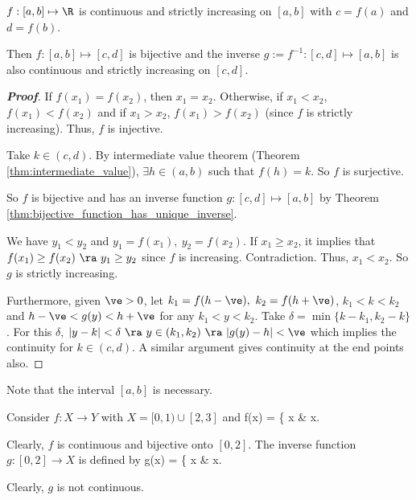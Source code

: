 

\begin{theorem}\label{thm:real_strictly_increasing_continuous_bijective_inverse_strictly_increasing_continuous}%
$f: [a,b]\mapsto \R$ is continuous and strictly increasing on $[a,b]$ with $c=f(a)$ and $d=f(b)$.

Then $f: [a,b]\mapsto [c,d]$ is bijective and the inverse $g:=f^{-1}: [c,d]\mapsto [a,b]$ is also continuous and strictly increasing on $[c,d]$.
\end{theorem}

\begin{proof}[{\bf Proof}]
If $f(x_1)=f(x_2)$, then $x_1=x_2$. Otherwise, if $x_1<x_2$, $f(x_1)<f(x_2)$ and if $x_1>x_2$, $f(x_1)>f(x_2)$ (since $f$ is strictly increasing). Thus, $f$ is injective.

Take $k\in(c,d)$. By intermediate value theorem (Theorem \ref{thm:intermediate_value}), $\exists h\in(a,b)$ such that $f(h)=k$. So $f$ is surjective.

So $f$ is bijective and has an inverse function $g: [c,d]\mapsto [a,b]$ by Theorem \ref{thm:bijective_function_has_unique_inverse}.

We have $y_1<y_2$ and $y_1=f(x_1), \ y_2=f(x_2)$. If $x_1\geq x_2$, it implies that $f(x_1)\geq f(x_2) \ \ra \ y_1\geq y_2$ since $f$ is increasing. Contradiction. Thus, $x_1 < x_2$. So $g$ is strictly increasing.

Furthermore, given $\ve>0$, let $k_1=f(h-\ve),\ k_2=f(h+\ve)$, $k_1<k<k_2$ and $h-\ve < g(y) < h+\ve$ for any $k_1<y<k_2$. Take $\delta = \min\{k-k_1,k_2-k\}$. For this $\delta$, $|y-k|<\delta \ \ra \ y\in (k_1,k_2)\ \ra \ |g(y)-h|<\ve$ which implies the continuity for $k\in(c,d)$. A similar argument gives continuity at the end points also.
\end{proof}

\begin{remark}
Note that the interval $[a,b]$ is necessary.%
\end{remark}

\begin{example}
Consider $f:X\to Y$ with $X = [0,1)\cup[2,3]$ and
\be
f(x) = \left\{
x & x\in [0,1)\\
x-1 \quad\quad & x\in [2,3]
\ea\right.
\ee

Clearly, $f$ is continuous and bijective onto $[0,2]$. The inverse function $g:[0,2]\to X$ is defined by
\be
g(x) = \left\{
x & x\in [0,1)\\
x+1 \quad\quad & x\in [1,2]
\ea\right.
\ee

Clearly, $g$ is not continuous.
\end{example}


